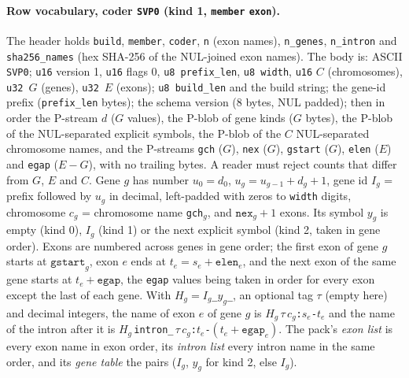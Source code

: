 \paragraph{Row vocabulary, coder \texttt{SVP0} (kind 1, \texttt{member} \texttt{exon}).}
The header holds \texttt{build}, \texttt{member}, \texttt{coder}, \texttt{n} (exon names), \texttt{n\_genes},
\texttt{n\_intron} and \texttt{sha256\_names} (hex SHA-256 of the NUL-joined exon names). The body is: ASCII
\texttt{SVP0}; \texttt{u16} version 1, \texttt{u16} flags 0, \texttt{u8 prefix\_len}, \texttt{u8 width}, \texttt{u16}
$C$ (chromosomes), \texttt{u32}~$G$ (genes), \texttt{u32}~$E$ (exons); \texttt{u8 build\_len} and the build string;
the gene-id prefix (\texttt{prefix\_len} bytes); the schema version (8 bytes, NUL padded); then in order the P-stream
$d$ ($G$ values), the P-blob of gene kinds ($G$ bytes), the P-blob of the NUL-separated explicit symbols, the P-blob of
the $C$ NUL-separated chromosome names, and the P-streams \texttt{gch} ($G$), \texttt{nex} ($G$), \texttt{gstart} ($G$),
\texttt{elen} ($E$) and \texttt{egap} ($E-G$), with no trailing bytes. A reader must reject counts that differ from
$G$, $E$ and $C$. Gene $g$ has number $u_0=d_0$, $u_g=u_{g-1}+d_g+1$, gene id $I_g$ = prefix followed by $u_g$ in
decimal, left-padded with zeros to \texttt{width} digits, chromosome $c_g$ = chromosome name \texttt{gch}$_g$, and
$\texttt{nex}_g+1$ exons. Its symbol $y_g$ is empty (kind 0), $I_g$ (kind 1) or the next explicit symbol (kind 2,
taken in gene order). Exons are numbered across genes in gene order; the first exon of gene $g$ starts at
$\texttt{gstart}_g$, exon $e$ ends at $t_e=s_e+\texttt{elen}_e$, and the next exon of the same gene starts at
$t_e+\texttt{egap}$, the \texttt{egap} values being taken in order for every exon except the last of each gene. With
$H_g=I_g$\texttt{\_}$y_g$\texttt{\_}, an optional tag $\tau$ (empty here) and decimal integers, the name of exon $e$
of gene $g$ is $H_g\,\tau\,c_g$\texttt{:}$s_e$\texttt{-}$t_e$ and the name of the intron after it is
$H_g$\,\texttt{intron\_}\,$\tau\,c_g$\texttt{:}$t_e$\texttt{-}$(t_e+\texttt{egap}_e)$. The pack's \emph{exon list} is
every exon name in exon order, its \emph{intron list} every intron name in the same order, and its \emph{gene table}
the pairs ($I_g$, $y_g$ for kind 2, else $I_g$).

